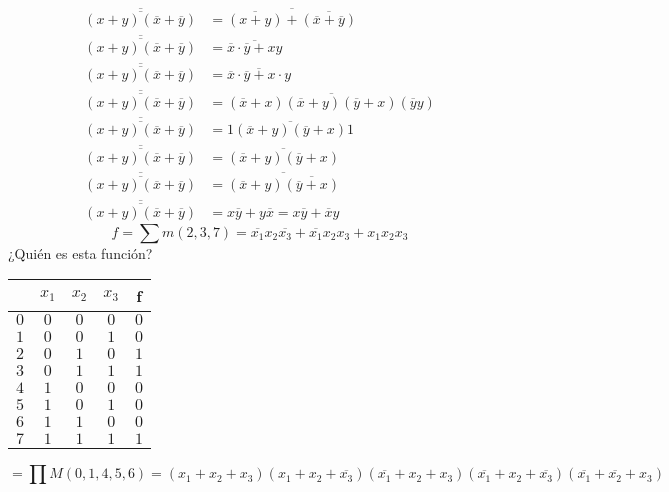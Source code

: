 \documentclass[12pt, twoside]{article}
\begin{document}
\begin{align*}
	\overline{\overline{(x+y)(\overline{x}+\overline{y})}} &=
	\overline{\overline{(x+y)}+\overline{(\overline{x}+\overline{y})}}\\
	\overline{\overline{(x+y)(\overline{x}+\overline{y})}} &=
	\overline{\overline{x}\cdot\overline{y}+xy}\\
	\overline{\overline{(x+y)(\overline{x}+\overline{y})}} &=
	\overline{\overline{x}\cdot\overline{y}+x\cdot y}\\
	\overline{\overline{(x+y)(\overline{x}+\overline{y})}} &=
	\overline{(\overline{x}+x)(\overline{x}+y)(\overline{y}+x)(\overline{y}y)}\\
	\overline{\overline{(x+y)(\overline{x}+\overline{y})}} &=
	\overline{1(\overline{x}+y)(\overline{y}+x)1}\\
	\overline{\overline{(x+y)(\overline{x}+\overline{y})}} &=
	\overline{(\overline{x}+y)(\overline{y}+x)}\\
	\overline{\overline{(x+y)(\overline{x}+\overline{y})}} &=
	\overline{(\overline{x}+y)\overline{(\overline{y}+x)}}\\
	\overline{\overline{(x+y)(\overline{x}+\overline{y})}} &=
	x\overline{y}+y\overline{x} = \boxed{x\overline{y}+\overline{x}y}
\end{align*}
\[f=\sum m(2,3,7)=\overline{x_1}x_2\overline{x_3}+\overline{x_1}x_2x_3+x_1x_2x_3\]
¿Quién es esta función?
\begin{center}
	\begin{tabular}{c|ccc|c|}
		& $x_1$ & $x_2$ & $x_3$ & f\\
		\hline
		$0$ & $0$ & $0$ & $0$ & $0$\\
		$1$ & $0$ & $0$ & $1$ & $0$\\
		$2$ & $0$ & $1$ & $0$ & $1$\\
		$3$ & $0$ & $1$ & $1$ & $1$\\
		$4$ & $1$ & $0$ & $0$ & $0$\\
		$5$ & $1$ & $0$ & $1$ & $0$\\
		$6$ & $1$ & $1$ & $0$ & $0$\\
		$7$ & $1$ & $1$ & $1$ & $1$\\
	\end{tabular}
\end{center}
\[=\prod M(0,1,4,5,6)=
	(x_1+x_2+x_3)
	(x_1+x_2+\overline{x_3})
	(\overline{x_1}+x_2+x_3)
	(\overline{x_1}+x_2+\overline{x_3})
	(\overline{x_1}+\overline{x_2}+x_3)
\]
\end{document}
